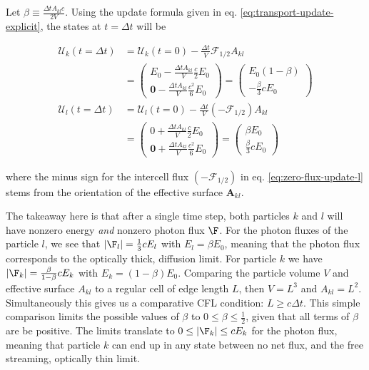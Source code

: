 Let $\beta \equiv \frac{\Delta t A_{kl} c}{2 V}$. Using the update formula given in eq. 
\ref{eq:transport-update-explicit}, the states at $t = \Delta t$ will be

\begin{align}
	\mathcal{U}_k(t = \Delta t) &= \mathcal{U}_k (t = 0) - \frac{\Delta t}{V} \mathcal{F}_{1/2}
A_{kl} \\
	&=	\left(\begin{matrix}
        E_0 -  \frac{\Delta t A_{kl}}{V} \frac{c}{2} E_0 \\
        \mathbf{0} - \frac{\Delta t A_{kl}}{V} \frac{c^2}{6} E_0
	  	\end{matrix} \right)
    = \left( \begin{matrix}
             E_0 (1 - \beta) \\
             -\frac{\beta}{3} c E_0
             \end{matrix} \right) \\
%
	\mathcal{U}_l(t = \Delta t) &= \mathcal{U}_l (t = 0) - \frac{\Delta t}{V} (-\mathcal{F}_{1/2}) 
A_{kl} \label{eq:zero-flux-update-l}\\
	&=	\left(\begin{matrix}
        0 +  \frac{\Delta t A_{kl}}{V} \frac{c}{2} E_0 \\
        \mathbf{0} + \frac{\Delta t A_{kl}}{V} \frac{c^2}{6} E_0
	  	\end{matrix} \right)
    = \left( \begin{matrix}
             \beta E_0 \\
             \frac{\beta}{3} c E_0
             \end{matrix} \right)
\end{align}

where the minus sign for the intercell flux $(-\mathcal{F}_{1/2})$ in eq. 
\ref{eq:zero-flux-update-l} stems from the orientation of the effective surface $\mathbf{A}_{kl}$.


The takeaway here is that after a single time step, both particles $k$ and $l$ will have nonzero 
energy \emph{and} nonzero photon flux $\F$. 
For the photon fluxes of the particle $l$, we see that $|\F_l| = \frac{1}{3} c E_l$ with $E_l = 
\beta E_0$, meaning that the photon flux corresponds to the optically thick, diffusion limit. For 
particle $k$ we have $|\F_k| = \frac{\beta}{1 - \beta} c E_k$ with $E_k = (1 - \beta) E_0$. 
Comparing the particle volume $V$ and effective surface $A_{kl}$ to a regular cell of edge length 
$L$, then $V = L^3$ and $A_{kl} = L^2$. Simultaneously this gives us a comparative CFL condition: $L 
\geq c \Delta t$. This simple comparison limits the possible values of $\beta$ to $0 \leq \beta 
\leq \frac{1}{2}$, given that all terms of $\beta$ are be positive. The limits translate to 
$0 \leq |\F_k| \leq c E_k$ for the photon flux, meaning that particle $k$ can end up in any state 
between no net flux, and the free streaming, optically thin limit.









